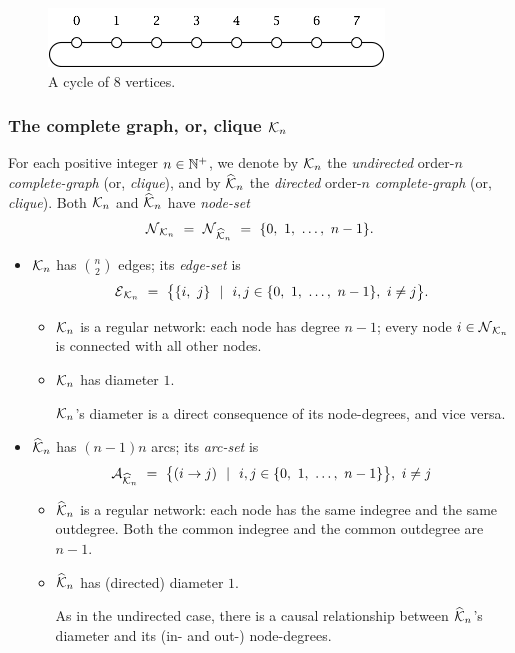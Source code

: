 \begin{figure}[hbt]
\begin{center}
       \includegraphics[scale=0.6]{FiguresGraph/cycle}
       \caption{A cycle of $8$ vertices.}
  \label{fig:cycle}
\end{center}
\end{figure}

\subsubsection{The complete graph, or, clique $\mbox{$\cal K$}_n$}
\label{sec:clique}
 

For each positive integer $n \in \mathbb{N}^+$, we denote by $\mbox{$\cal K$}_n$ the {\em
  undirected} order-$n$ {\it complete-graph} (or, {\it clique}),
  and by $\widehat{\mbox{$\cal K$}}_n$ the {\em
  directed} order-$n$ {\it complete-graph} (or, {\it clique}).  Both
$\mbox{$\cal K$}_n$ and $\widehat{\mbox{$\cal K$}}_n$ have {\it node-set}
\[ \mbox{$\cal N$}_{{\cal K}_n} \ = \ \mbox{$\cal N$}_{\widehat{{\cal K}}_n}
\ = \ \{ 0, \ 1, \ \ldots, \ n-1\}. \]
\begin{itemize}
\item
$\mbox{$\cal K$}_n$ has $\displaystyle {n \choose 2}$ edges; its {\it edge-set} is
\[ \mbox{$\cal E$}_{{\cal K}_n} \ = \
\big\{ \{i, \ j\} \ \ | \ \ i,j \in \{0, \ 1, \ \ldots, \ n-1\}, \ i
\neq j \big\}.
\]
  \begin{itemize}
  \item {} 
$\mbox{$\cal K$}_n$ is a regular network: each node has degree $n-1$; every node $i
\in \mbox{$\cal N$}_{\mbox{{\scriptsize $\cal K$}}_n}$ is connected with all other nodes.

   \item {}
$\mbox{$\cal K$}_n$ has diameter $1$.

$\mbox{$\cal K$}_n$'s diameter is a direct consequence of its node-degrees, and vice versa.
  \end{itemize}

\item
$\widehat{\mbox{$\cal K$}}_n$ has $(n-1)n$ arcs; its {\it arc-set} is
\[ \a_{\widehat{{\cal K}}_n} \ = \ 
\big\{ (i \rightarrow j) \ \ | \ \ i,j \in \{0, \ 1, \ \ldots, \ n-1\}
\big\}, \ i \neq j
\]
  \begin{itemize}
  \item
$\widehat{\mbox{$\cal K$}}_n$ is a regular network: each node has the same indegree
    and the same outdegree.  Both the common indegree and the common
    outdegree are $n-1$.
  \item
$\widehat{\mbox{$\cal K$}}_n$ has (directed) diameter $1$.

As in the undirected case, there is a causal relationship between
$\widehat{\mbox{$\cal K$}}_n$'s diameter and its (in- and out-) node-degrees.
  \end{itemize}
\end{itemize}

